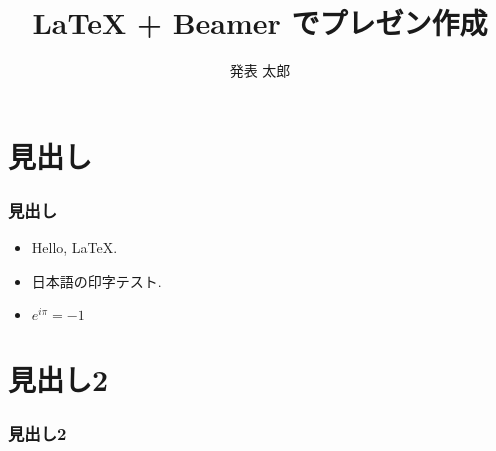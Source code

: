 \documentclass[dvipdfmx, 12pt]{beamer}
\title{LaTeX + Beamer でプレゼン作成}
\subtitle{}
\author{発表 太郎}
\institute{◯◯学科 ◯◯研究室}
\date{}
\begin{document}
\begin{frame}[plain]
  \frametitle{}
  \titlepage %
\end{frame}

\frame{\tableofcontents[hideallsubsections]} %
\section{見出し}
\begin{frame}
  \frametitle{見出し}

  \begin{itemize}
    \item Hello, \LaTeX.
    \item 日本語の印字テスト.
    \item $e^{i\pi} = -1$
  \end{itemize}

\end{frame}

\section{見出し2}
\begin{frame}
  \frametitle{見出し2}

\end{frame}

%
%
%
\end{document}
